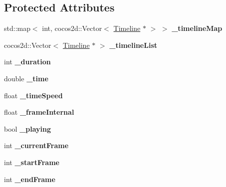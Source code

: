 \subsection*{Protected Attributes}
\begin{DoxyCompactItemize}
\item 
\mbox{\label{classActionTimeline_a9e54b0c88b6cfecd99fb3ed6e49bad2f}} 
std\+::map$<$ int, cocos2d\+::\+Vector$<$ \hyperlink{classTimeline}{Timeline} $\ast$ $>$ $>$ {\bfseries \+\_\+timeline\+Map}
\item 
\mbox{\label{classActionTimeline_a1d4fbe49c79bb88fbcdd22308d640fea}} 
cocos2d\+::\+Vector$<$ \hyperlink{classTimeline}{Timeline} $\ast$ $>$ {\bfseries \+\_\+timeline\+List}
\item 
\mbox{\label{classActionTimeline_a96662497cabe7269725cb3cd46f246cb}} 
int {\bfseries \+\_\+duration}
\item 
\mbox{\label{classActionTimeline_a9eb3ae1331791dca6833fa8b9c8f4a3c}} 
double {\bfseries \+\_\+time}
\item 
\mbox{\label{classActionTimeline_aaf2ce16abadbe93c1ed2d0566bc5d1d6}} 
float {\bfseries \+\_\+time\+Speed}
\item 
\mbox{\label{classActionTimeline_a135f4c37dd70f84f8f83ebe6ebd9065a}} 
float {\bfseries \+\_\+frame\+Internal}
\item 
\mbox{\label{classActionTimeline_a98c69ea84dd78e6f11d2f2cca6b45939}} 
bool {\bfseries \+\_\+playing}
\item 
\mbox{\label{classActionTimeline_a56c992a4a5ce6faee89fcdd583765f90}} 
int {\bfseries \+\_\+current\+Frame}
\item 
\mbox{\label{classActionTimeline_a8dbacc2428a2c42d84c26f66f24a65b9}} 
int {\bfseries \+\_\+start\+Frame}
\item 
\mbox{\label{classActionTimeline_a0073837c56d4dea89a26cf992ba36881}} 
int {\bfseries \+\_\+end\+Frame}

\end{DoxyCompactItemize}
